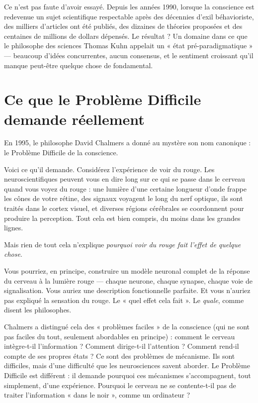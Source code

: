 \documentclass[11pt, twoside, openright]{book}
\begin{document}
Ce n'est pas faute d'avoir essayé. Depuis les années 1990, lorsque la conscience est redevenue un sujet scientifique respectable après des décennies d'exil béhavioriste, des milliers d'articles ont été publiés, des dizaines de théories proposées et des centaines de millions de dollars dépensés. Le résultat ? Un domaine dans ce que le philosophe des sciences Thomas Kuhn appelait un « état pré-paradigmatique » --- beaucoup d'idées concurrentes, aucun consensus, et le sentiment croissant qu'il manque peut-être quelque chose de fondamental.

\section*{Ce que le Problème Difficile demande réellement}

En 1995, le philosophe David Chalmers a donné au mystère son nom canonique : le Problème Difficile de la conscience.

Voici ce qu'il demande. Considérez l'expérience de voir du rouge. Les neuroscientifiques peuvent vous en dire long sur ce qui se passe dans le cerveau quand vous voyez du rouge : une lumière d'une certaine longueur d'onde frappe les cônes de votre rétine, des signaux voyagent le long du nerf optique, ils sont traités dans le cortex visuel, et diverses régions cérébrales se coordonnent pour produire la perception. Tout cela est bien compris, du moins dans les grandes lignes.

Mais rien de tout cela n'explique \textit{pourquoi voir du rouge fait l'effet de quelque chose}.

Vous pourriez, en principe, construire un modèle neuronal complet de la réponse du cerveau à la lumière rouge --- chaque neurone, chaque synapse, chaque voie de signalisation. Vous auriez une description fonctionnelle parfaite. Et vous n'auriez pas expliqué la sensation du rouge. Le « quel effet cela fait ». Le \textit{quale}, comme disent les philosophes.

Chalmers a distingué cela des « problèmes faciles » de la conscience (qui ne sont pas faciles du tout, seulement abordables en principe) : comment le cerveau intègre-t-il l'information ? Comment dirige-t-il l'attention ? Comment rend-il compte de ses propres états ? Ce sont des problèmes de mécanisme. Ils sont difficiles, mais d'une difficulté que les neurosciences savent aborder. Le Problème Difficile est différent : il demande pourquoi ces mécanismes s'accompagnent, tout simplement, d'une expérience. Pourquoi le cerveau ne se contente-t-il pas de traiter l'information « dans le noir », comme un ordinateur ?
\end{document}
